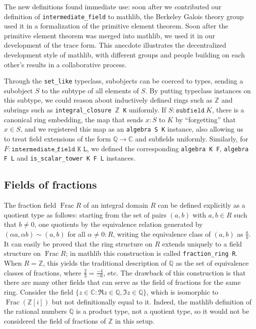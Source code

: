 \documentclass[sn-mathphys]{sn-jnl}%
\renewcommand{\C}{\mathbb{C}}
\newcommand{\lean}[1]{\texttt{#1}\xspace}
\newcommand{\mathlib}{\textsf{mathlib}\xspace}
\newcommand{\QQ}{\mathbb{Q}}
\renewcommand{\Z}{\mathbb{Z}}
\DeclareMathOperator{\Frac}{Frac}
\begin{document}
The new definitions found immediate use:
soon after we contributed our definition of \lean{intermediate\_field} to \mathlib,
the Berkeley Galois theory group used it in a formalization of the primitive element theorem.
Soon after the primitive element theorem was merged into \mathlib,
we used it in our development of the trace form.
This anecdote illustrates the decentralized development style of \mathlib,
with different groups and people building on each other's results in a collaborative process.

Through the \lean{set\_like} typeclass, subobjects can be coerced to types, sending a subobject $S$ to the subtype of all elements of $S$.
By putting typeclass instances on this subtype,
we could reason about inductively defined rings such as $\Z$ and subrings such as \lean{integral\_closure $\Z$ K} uniformly.
If $S : \lean{subfield}\ K$, there is a canonical ring embedding, the map that sends $x : S$ to $K$ by ``forgetting'' that $x \in S$,
and we registered this map as an \lean{algebra S K} instance, also allowing us to treat field extensions of the form $\QQ \to \C$ and subfields uniformly.
Similarly, for $F : \lean{intermediate\_field K L}$, we defined the corresponding \lean{algebra K F}, \lean{algebra F L} and \lean{is\_scalar\_tower K F L} instances.

\subsection{Fields of fractions}\label{subsection : fields of fractions}
The fraction field $\Frac R$ of an integral domain $R$ can be defined explicitly as a quotient type as follows:
starting from the set of pairs $(a,b)$ with $a,b \in R$ such that $b\neq 0$,
one quotients by the equivalence relation generated by $(\alpha a, \alpha b) \sim (a,b)$ for all $\alpha \ne 0 : R$, writing the equivalence class of $(a,b)$ as $\frac{a}{b}$.
It can easily be proved that the ring structure on $R$ extends uniquely to a field structure on $\Frac R$;
in \mathlib this construction is called \mbox{\lean{fraction\_ring R}}.
When $R=\Z$, this yields the traditional description of $\QQ$ as the set of equivalence classes of fractions, where $\frac{2}{3}=\frac{-4}{-6}$, etc.
The drawback of this construction is that there are many other fields that can serve as the field of fractions for the same ring.
Consider the field $\{z \in \C : \Re z \in \QQ, \Im z\in\QQ\}$, which is isomorphic to $\Frac (\Z[i])$ but not definitionally equal to it.
Indeed, the \mathlib definition of the rational numbers $\QQ$ is a product type, not a quotient type, so it would not be considered the field of fractions of $\Z$ in this setup.
\end{document}

